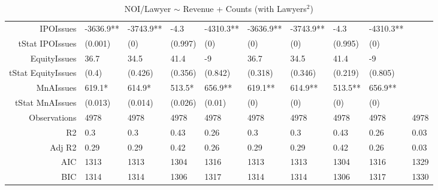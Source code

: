 \begin{table}[ht]
\begin{tabular}{rlllllllll}
  IPOIssues & -3636.9** & -3743.9** & -4.3 & -4310.3** & -3636.9** & -3743.9** & -4.3 & -4310.3** &  \\ 
  tStat IPOIssues & (0.001) & (0) & (0.997) & (0) & (0) & (0) & (0.995) & (0) &  \\ 
  EquityIssues & 36.7 & 34.5 & 41.4 & -9 & 36.7 & 34.5 & 41.4 & -9 &  \\ 
  tStat EquityIssues & (0.4) & (0.426) & (0.356) & (0.842) & (0.318) & (0.346) & (0.219) & (0.805) &  \\ 
  MnAIssues & 619.1* & 614.9* & 513.5* & 656.9** & 619.1** & 614.9** & 513.5** & 656.9** &  \\ 
  tStat MnAIssues & (0.013) & (0.014) & (0.026) & (0.01) & (0) & (0) & (0) & (0) &  \\ 
  Observations & 4978 & 4978 & 4978 & 4978 & 4978 & 4978 & 4978 & 4978 & 4978 \\ 
  R2 & 0.3 & 0.3 & 0.43 & 0.26 & 0.3 & 0.3 & 0.43 & 0.26 & 0.03 \\ 
  Adj R2 & 0.29 & 0.29 & 0.42 & 0.26 & 0.29 & 0.29 & 0.42 & 0.26 & 0.03 \\ 
  AIC & 1313 & 1313 & 1304 & 1316 & 1313 & 1313 & 1304 & 1316 & 1329 \\ 
  BIC & 1314 & 1314 & 1306 & 1317 & 1314 & 1314 & 1306 & 1317 & 1330 \\ 
   \hline
\end{tabular}
\caption{NOI/Lawyer $\sim$ Revenue + Counts (with Lawyers$^2$)} 
\end{table}
